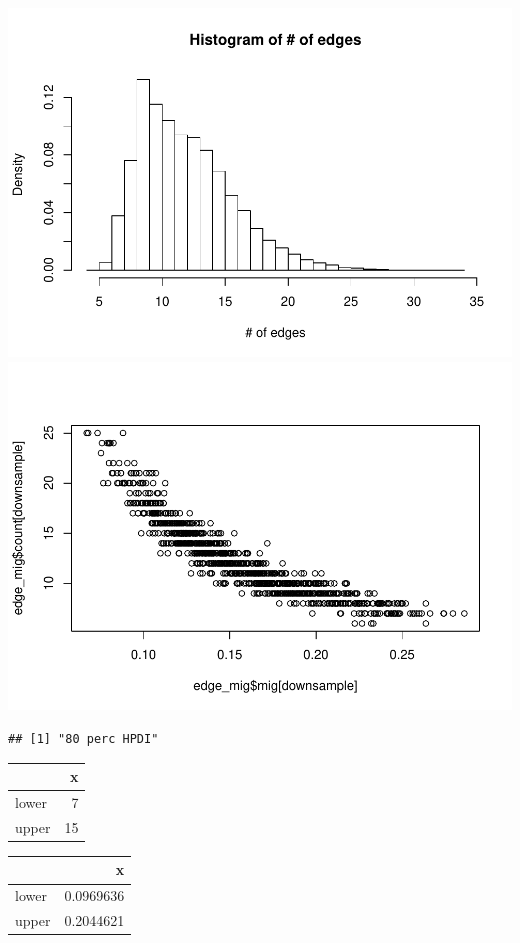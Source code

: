 \documentclass[11pt,a4paper]{article}
\numberwithin{equation}{section}
\begin{document}
\includegraphics{thesis_draft_files/figure-latex/unnamed-chunk-10-1.pdf}
\includegraphics{thesis_draft_files/figure-latex/unnamed-chunk-10-2.pdf}

\begin{verbatim}
## [1] "80 perc HPDI"
\end{verbatim}

\begin{table}

\centering
\begin{tabular}{l|r}
\hline
  & x\\
\hline
lower & 7\\
\hline
upper & 15\\
\hline
\end{tabular}
\centering
\begin{tabular}{l|r}
\hline
  & x\\
\hline
lower & 0.0969636\\
\hline
upper & 0.2044621\\
\hline
\end{tabular}
\end{table}
\end{document}

